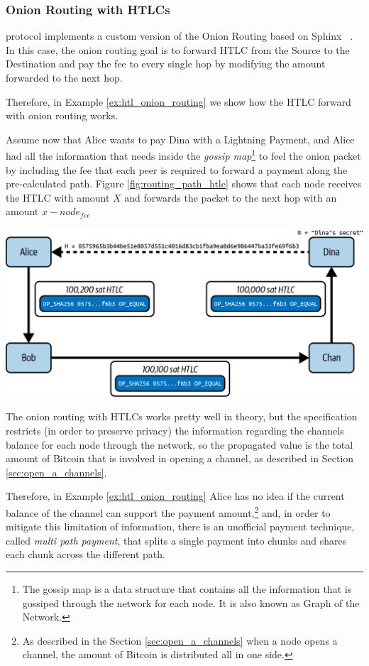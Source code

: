 \subsubsection{Onion Routing with HTLCs}

{\LN} protocol implements a custom version of the Onion Routing based on Sphinx ~\cite{sphinx}. In this case, the onion routing goal is to forward HTLC from the Source to the Destination and pay the fee to
every single hop by modifying the amount forwarded to the next hop.

Therefore, in Example \ref{ex:htl_onion_routing} we show how the HTLC forward with onion routing works.

\begin{example}
  \label{ex:htl_onion_routing}
  Assume now that Alice wants to pay Dina with a Lightning Payment, and Alice had all the
  information that needs inside the \emph{gossip map}\footnote{The gossip map is a data structure that contains all the information that is gossiped through the network for each node. It is also known as Graph of the Network.} to feel the
  onion packet by including the fee that each peer is required to forward a payment
  along the pre-calculated path. Figure \ref{fig:routing_path_htlc} shows that each node receives the HTLC with
  amount $X$ and forwards the packet to the next hop with an amount $x - node_{fee}$

  {\centering
      \includegraphics[width=0.6\columnwidth]{imgs/mtln_1008.png}
  \par}  
\end{example}

The onion routing with HTLCs works pretty well in theory, but the {\LN} specification restricts (in order to preserve privacy) the information regarding
the channels balance for each node through the network, so the propagated value is the total amount of Bitcoin that is involved in opening a channel, as described in Section \ref{sec:open_a_channels}.

Therefore, in Example \ref{ex:htl_onion_routing} Alice has no idea if the current balance of the channel can support the payment amount,\footnote{As described in the Section \ref{sec:open_a_channels} when a node opens a channel, the amount of Bitcoin is distributed all in one side.} and, in order to mitigate this limitation of information, there is an unofficial payment technique, called \emph{multi path payment}, that splits a single payment into chunks and shares each chunk across the different path.

